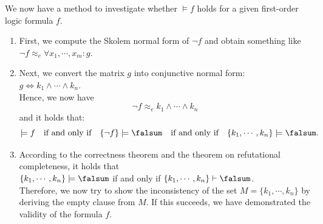 \noindent
We now have a method to investigate whether $\models f$ holds for a given first-order logic formula $f$.
\begin{enumerate}
\item First, we compute the Skolem normal form of $\neg f$ and obtain something like \\[0.2cm]
      \hspace*{1.3cm} $\neg f \approx_e \forall x_1, \cdots, x_m \colon g$.
\item Next, we convert the matrix $g$ into conjunctive normal form: 
      \\[0.2cm]
      \hspace*{1.3cm}
    $g \Leftrightarrow k_1 \wedge \cdots \wedge k_n$.
      \\[0.2cm]
      Hence, we now have 
      \[ \neg f \approx_e k_1 \wedge \cdots \wedge k_n \] 
      and it holds that: 
      \[  
          \models f \quad \mbox{if and only if} \quad
          \{\neg f\} \models \falsum \quad \mbox{if and only if} \quad 
          \{k_1,\cdots,k_n\} \models \falsum.
      \]
\item According to the correctness theorem and the theorem on refutational completeness, it holds that
      \\[0.2cm]
      \hspace*{1.3cm} 
      $\{k_1,\cdots,k_n\} \models \falsum$ \quad if and only if \quad 
      $\{k_1,\cdots,k_n\} \vdash \falsum$. \\[0.2cm]
      Therefore, we now try to show the inconsistency of the set $M = \{ k_1, \cdots, k_n \}$ by deriving the empty clause from $M$.
      If this succeeds, we have demonstrated the validity of the formula $f$.
\end{enumerate}

